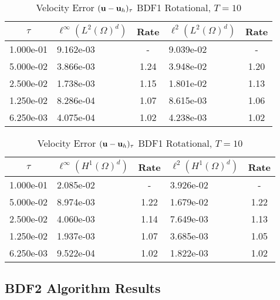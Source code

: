 \documentclass[letterpaper]{erdc}
\begin{document}
\begin{table}[h!]
  \parbox{.45\linewidth}{
  \tiny
  \centering
    \caption{Velocity Error $(\textbf{u} - \textbf{u}_h)_{\tau}$ BDF1 Rotational, $T=10$}
    \begin{tabular}{c|l|c|l|c}
      $\tau$ &  $\ell^{\infty}\left(L^2(\Omega)^d\right)$ &  Rate  &  $\ell^2\left(L^2(\Omega)^d\right)$  &  Rate\\
      \hline
      1.000e-01 & 9.162e-03 &   -  & 9.039e-02 &   - \\
      5.000e-02 & 3.866e-03 & 1.24 & 3.948e-02 & 1.20\\
      2.500e-02 & 1.738e-03 & 1.15 & 1.801e-02 & 1.13\\
      1.250e-02 & 8.286e-04 & 1.07 & 8.615e-03 & 1.06\\
      6.250e-03 & 4.075e-04 & 1.02 & 4.238e-03 & 1.02
    \end{tabular}
    }
    \hfill
    \parbox{.45\linewidth}{
    \tiny
    \centering
      \caption{Velocity Error $(\textbf{u} - \textbf{u}_h)_{\tau}$ BDF1 Rotational, $T=10$}
      \begin{tabular}{c|l|c|l|c}
        $\tau$ &  $\ell^{\infty}\left(H^1(\Omega)^d\right)$ &  Rate  &  $\ell^2\left(H^1(\Omega)^d\right)$  &  Rate\\
        \hline
        1.000e-01 & 2.085e-02 &   -  & 3.926e-02 &   - \\
        5.000e-02 & 8.974e-03 & 1.22 & 1.679e-02 & 1.22\\
        2.500e-02 & 4.060e-03 & 1.14 & 7.649e-03 & 1.13\\
        1.250e-02 & 1.937e-03 & 1.07 & 3.685e-03 & 1.05\\
        6.250e-03 & 9.522e-04 & 1.02 & 1.822e-03 & 1.02
      \end{tabular}
    }
\end{table}


 \newpage

\subsection{BDF2 Algorithm Results}
\end{document}
